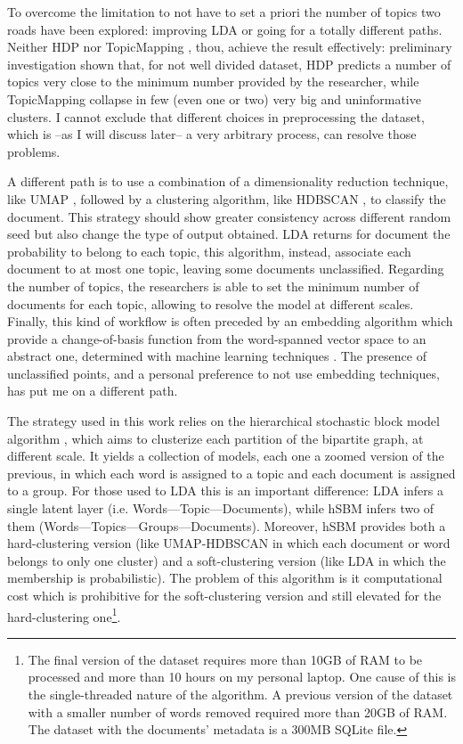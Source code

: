 \documentclass[a4paper, 11pt, headings=standardclasses, tablecaptionsbelow]{scrartcl}
\begin{document}
To overcome the limitation to not have to set a priori the number of topics two roads have been explored: improving LDA \parencite[like in][]{teh2005,lancichinetti2015} or going for a totally different paths.
Neither HDP \parencite{teh2005} nor TopicMapping \parencite{lancichinetti2015}, thou, achieve the result effectively: preliminary investigation shown that, for not well divided dataset, HDP predicts a number of topics very close to the minimum number provided by the researcher, while TopicMapping collapse in few (even one or two) very big and uninformative clusters. I cannot exclude that different choices in preprocessing the dataset, which is --as I will discuss later-- a very arbitrary process, can resolve those problems.

A different path is to use a combination of a dimensionality reduction technique, like UMAP \parencite{mcinnes2020}, followed by a clustering algorithm, like HDBSCAN \parencite{campello2013,mcinnes2017}, to classify the document. This strategy should show greater consistency across different random seed but also change the type of output obtained. LDA returns for document the probability to belong to each topic, this algorithm, instead, associate each document to at most one topic, leaving some documents unclassified. Regarding the number of topics, the researchers is able to set the minimum number of documents for each topic, allowing to resolve the model at different scales. Finally, this kind of workflow is often preceded by an embedding algorithm which provide a change-of-basis function from the word-spanned vector space to an abstract one, determined with machine learning techniques \parencite{angelov2020,grootendorst2022}.
The presence of unclassified points, and a personal preference to not use embedding techniques, has put me on a different path.

The strategy used in this work relies on the hierarchical stochastic block model algorithm \parencite[hSBM][]{peixoto2019,gerlach2018}, which aims to clusterize each partition of the bipartite graph, at different scale. It yields a collection of models, each one a zoomed version of the previous, in which each word is assigned to a topic and each document is assigned to a group. For those used to LDA this is an important difference: LDA infers a single latent layer (i.e. Words---Topic---Documents), while hSBM infers two of them (Words---Topics---Groups---Documents). Moreover, hSBM provides both a hard-clustering version (like UMAP-HDBSCAN in which each document or word belongs to only one cluster) and a soft-clustering version (like LDA in which the membership is probabilistic). The problem of this algorithm is it computational cost which is prohibitive for the soft-clustering version and still elevated for the hard-clustering one\footnote{The final version of the dataset requires more than 10GB of RAM to be processed and more than 10 hours on my personal laptop. One cause of this is the single-threaded nature of the algorithm. A previous version of the dataset with a smaller number of words removed required more than 20GB of RAM. The dataset with the documents' metadata is a 300MB SQLite file.}.
\end{document}
